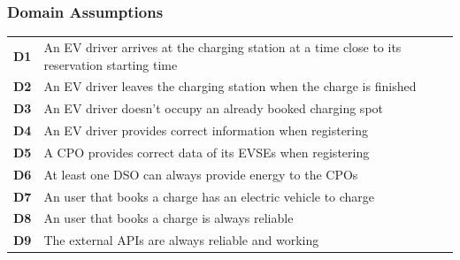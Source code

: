 \subsubsection*{Domain Assumptions}
\begin{table}[H]
      \begin{tabularx}{\textwidth}{cX}
            \toprule
            \textbf{D1} & An EV driver arrives at the charging station at a time close to its reservation starting time \\
            \textbf{D2} & An EV driver leaves the charging station when the charge is finished                          \\
            \textbf{D3} & An EV driver doesn't occupy an already booked charging spot                                   \\
            \textbf{D4} & An EV driver provides correct information when registering                                    \\
            \textbf{D5} & A CPO provides correct data of its EVSEs when registering                                     \\
            \textbf{D6} & At least one DSO can always provide energy to the CPOs                                        \\
            \textbf{D7} & An user that books a charge has an electric vehicle to charge                                 \\
            \textbf{D8} & An user that books a charge is always reliable                                                \\
            \textbf{D9} & The external APIs are always reliable and working                                             \\
            \bottomrule
      \end{tabularx}
\end{table}
